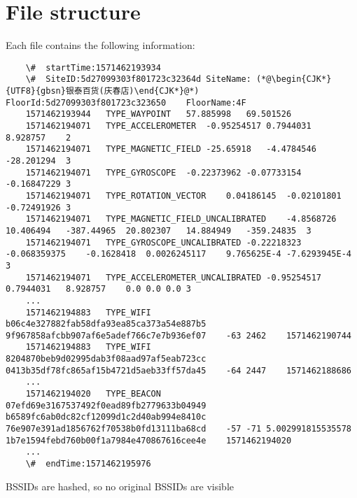 \section{File structure}\label{sec:file-structure}
Each file contains the following information:




\begin{lstlisting}
    \#	startTime:1571462193934
    \#	SiteID:5d27099303f801723c32364d	SiteName: (*@\begin{CJK*}{UTF8}{gbsn}银泰百货(庆春店)\end{CJK*}@*) FloorId:5d27099303f801723c323650	FloorName:4F
    1571462193944	TYPE_WAYPOINT	57.885998	69.501526
    1571462194071	TYPE_ACCELEROMETER	-0.95254517	0.7944031	8.928757	2
    1571462194071	TYPE_MAGNETIC_FIELD	-25.65918	-4.4784546	-28.201294	3
    1571462194071	TYPE_GYROSCOPE	-0.22373962	-0.07733154	-0.16847229	3
    1571462194071	TYPE_ROTATION_VECTOR	0.04186145	-0.02101801	-0.72491926	3
    1571462194071	TYPE_MAGNETIC_FIELD_UNCALIBRATED	-4.8568726	10.406494	-387.44965	20.802307	14.884949	-359.24835	3
    1571462194071	TYPE_GYROSCOPE_UNCALIBRATED	-0.22218323	-0.068359375	-0.1628418	0.0026245117	9.765625E-4	-7.6293945E-4	3
    1571462194071	TYPE_ACCELEROMETER_UNCALIBRATED	-0.95254517	0.7944031	8.928757	0.0	0.0	0.0	3
    ...
    1571462194883	TYPE_WIFI	b06c4e327882fab58dfa93ea85ca373a54e887b5	9f967858afcbb907af6e5adef766c7e7b936ef07	-63	2462	1571462190744
    1571462194883	TYPE_WIFI	8204870beb9d02995dab3f08aad97af5eab723cc	0413b35df78fc865af15b4721d5aeb33ff57da45	-64	2447	1571462188686
    ...
    1571462194020	TYPE_BEACON	07efd69e3167537492f0ead89fb2779633b04949	b6589fc6ab0dc82cf12099d1c2d40ab994e8410c	76e907e391ad1856762f70538b0fd13111ba68cd	-57	-71	5.002991815535578	1b7e1594febd760b00f1a7984e470867616cee4e	1571462194020
    ...
    \#	endTime:1571462195976
\end{lstlisting}





BSSIDs are hashed, so no original BSSIDs are visible

